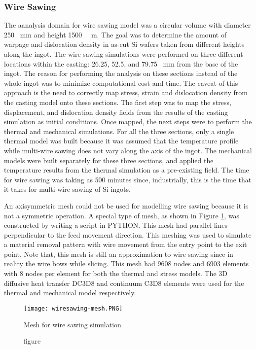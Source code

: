 \subsubsection{Wire Sawing}
The aanalysis domain for wire sawing model was a circular volume with diameter 250 \SI{}{mm} and height 1500 \SI{}{\micro.m}. The goal was to determine the amount of warpage and dislocation density in as-cut Si wafers taken from different heights along the ingot. The wire sawing simulations were performed on three different locations within the casting: 26.25, 52.5, and 79.75 \SI{}{mm} from the base of the ingot. The reason for performing the analysis on these sections instead of the whole ingot was to minimize computational cost and time. The caveat of this approach is the need to correctly map stress, strain and dislocation density from the casting model onto these sections. The first step was to map the stress, displacement, and dislocation density fields from the results of the casting simulation as initial conditions. Once mapped, the next steps were to perform the thermal and mechanical simulations. For all the three sections, only a single thermal model was built because it was assumed that the temperature profile while multi-wire sawing does not vary along the axis of the ingot. The mechanical models were built separately for these three sections, and applied the temperature results from the thermal simulation as a pre-existing field. The time for wire sawing was taking as 500 minutes since, industrially, this is the time that it takes for multi-wire sawing of Si ingots.  

An axisymmetric mesh could not be used for modelling wire sawing because it is not a symmetric operation. A special type of mesh, as shown in Figure \ref{fig:wiresawing-mesh}, was constructed by writing a script in PYTHON. This mesh had parallel lines perpendicular to the feed movement direction. This meshing was used to simulate a material removal pattern with wire movement from the entry point to the exit point. Note that, this mesh is still an approximation to wire sawing since in reality the wire bows while slicing. This mesh had 9608 nodes and 6903 elements with 8 nodes per element for both the thermal and stress models. The 3D diffusive heat transfer DC3D8 and continuum C3D8 elements were used for the thermal and mechanical model respectively.

\begin{figure}
    \centering
    \texttt{[image: wiresawing-mesh.PNG]}
    \caption{figure}{Mesh for wire sawing simulation}
    \label{fig:wiresawing-mesh}
\end{figure}

